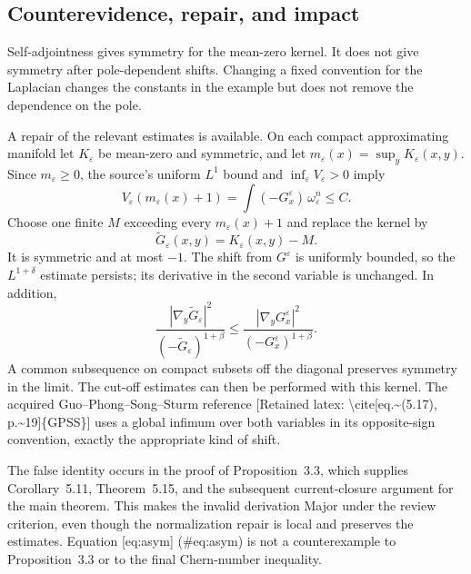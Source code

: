 \documentclass[10pt]{article}
\begin{document}
\subsection*{Counterevidence, repair, and impact}
Self-adjointness gives symmetry for the mean-zero kernel. It does not give symmetry after pole-dependent shifts. Changing a fixed convention for the Laplacian changes the constants in the example but does not remove the dependence on the pole.\par
A repair of the relevant estimates is available. On each compact approximating manifold let \(K_\varepsilon\) be mean-zero and symmetric, and let \(m_\varepsilon(x)=\sup_yK_\varepsilon(x,y)\). Since \(m_\varepsilon\geq0\), the source’s uniform \(L^1\) bound and \(\inf_\varepsilon V_\varepsilon>0\) imply \[V_\varepsilon(m_\varepsilon(x)+1)
 =\int(-G_x^\varepsilon)\,\omega_\varepsilon^n\leq C.\] Choose one finite \(M\) exceeding every \(m_\varepsilon(x)+1\) and replace the kernel by \[\widetilde G_\varepsilon(x,y)=K_\varepsilon(x,y)-M.\] It is symmetric and at most \(-1\). The shift from \(G^\varepsilon\) is uniformly bounded, so the \(L^{1+\delta}\) estimate persists; its derivative in the second variable is unchanged. In addition, \[\frac{|\nabla_y\widetilde G_\varepsilon|^2}
      {(-\widetilde G_\varepsilon)^{1+\beta}}
 \leq
 \frac{|\nabla_yG_x^\varepsilon|^2}
      {(-G_x^\varepsilon)^{1+\beta}}.\] A common subsequence on compact subsets off the diagonal preserves symmetry in the limit. The cut-off estimates can then be performed with this kernel. The acquired Guo–Phong–Song–Sturm reference [Retained latex: \textbackslash{}cite[eq.\textasciitilde{}(5.17), p.\textasciitilde{}19]\{GPSS\}] uses a global infimum over both variables in its opposite-sign convention, exactly the appropriate kind of shift.\par
The false identity occurs in the proof of Proposition 3.3, which supplies Corollary 5.11, Theorem 5.15, and the subsequent current-closure argument for the main theorem. This makes the invalid derivation Major under the review criterion, even though the normalization repair is local and preserves the estimates. Equation [eq:asym] (\#eq:asym) is not a counterexample to Proposition 3.3 or to the final Chern-number inequality.\par
\end{document}
